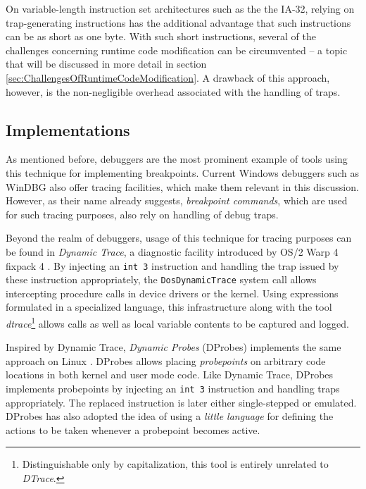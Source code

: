 On variable-length instruction set architectures such as the the IA-32, relying on trap-generating 
instructions has the additional advantage that such instructions can be as short
as one byte. With such short instructions, several of the challenges concerning runtime
code modification can be circumvented -- a topic that will be discussed in more detail 
in section \ref{sec:ChallengesOfRuntimeCodeModification}. 
A drawback of this approach, however, is the non-negligible overhead associated
with the handling of traps.



\subsection*{Implementations}
As mentioned before, debuggers are the most prominent example of tools using
this technique for implementing breakpoints. Current Windows debuggers such 
as WinDBG also offer tracing facilities, which make them relevant
in this discussion. However, as their name already suggests, \emph{breakpoint commands},
which are used for such tracing purposes, also rely on handling of
debug traps.





Beyond the realm of debuggers, usage of this technique 
for tracing purposes can be found in \emph{Dynamic Trace},
a diagnostic facility introduced by OS/2 Warp 4 fixpack 4 \cite{Warp97}.
By injecting an \verb|int 3| instruction and handling the trap issued by
these instruction appropriately, the \verb|DosDynamicTrace| system call allows
intercepting procedure calls in device drivers or the kernel. Using expressions
formulated in a specialized language, this infrastructure along with the tool 
\emph{dtrace}\footnote{Distinguishable only by capitalization, this tool is entirely unrelated to \emph{DTrace}.}
allows calls as well as local variable contents to be captured and 
logged.

Inspired by Dynamic Trace, \emph{Dynamic Probes} (DProbes) implements the
same approach on Linux \cite{Moore01}. DProbes allows placing \emph{probepoints}
on arbitrary code locations in both kernel and user mode code. Like Dynamic
Trace, DProbes implements probepoints by injecting an \verb|int 3| 
instruction and handling traps appropriately. The replaced instruction
is later either single-stepped or emulated. DProbes has also adopted the 
idea of using a \emph{little language} for defining the actions to be taken whenever
a probepoint becomes active.

